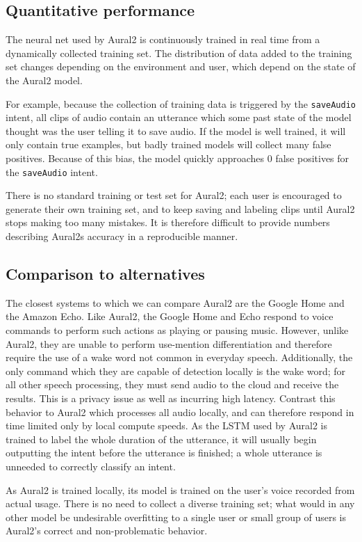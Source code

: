 \documentclass[conference]{IEEEtran}
\begin{document}
\subsection{Quantitative performance}
The neural net used by Aural2 is continuously trained in real time from a dynamically collected training set.
The distribution of data added to the training set changes depending on the environment and user, which depend on the state of the Aural2 model.

For example, because the collection of training data is triggered by the \texttt{saveAudio} intent,
all clips of audio contain an utterance which some past state of the model thought was the user telling it to save audio.
If the model is well trained, it will only contain true examples, but badly trained models will collect many false positives.
Because of this bias, the model quickly approaches 0 false positives for the \texttt{saveAudio} intent.

There is no standard training or test set for Aural2; each user is
encouraged to generate their own training set, and to keep saving and
labeling clips until Aural2 stops making too many mistakes.
It is therefore difficult to provide numbers describing Aural2s accuracy in a reproducible manner.

\subsection{Comparison to alternatives}
The closest systems to which we can compare Aural2 are the Google Home and the Amazon Echo.
Like Aural2, the Google Home and Echo respond to voice commands to perform such actions as playing or pausing music.
However, unlike Aural2, they are unable to perform use-mention differentiation and therefore require the use of a wake word not common in everyday speech.
Additionally, the only command which they are capable of detection locally is the wake word;
for all other speech processing, they must send audio to the cloud and receive the results.
This is a privacy issue as well as incurring high latency.
Contrast this behavior to Aural2 which processes all audio locally, and can therefore
respond in time limited only by local compute speeds.
As the LSTM used by Aural2 is trained to label the whole duration of the utterance,
it will usually begin outputting the intent before the utterance is finished; a whole utterance is unneeded to correctly classify an intent.

As Aural2 is trained locally, its model is trained on the user's voice recorded from actual usage.
There is no need to collect a diverse training set; what would in any other model be undesirable overfitting to a single user or small group of users is Aural2's correct and non-problematic behavior.
\end{document}
